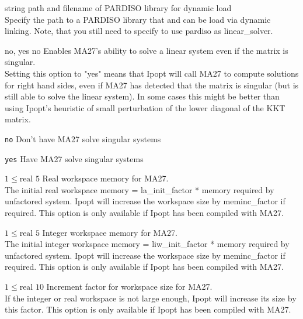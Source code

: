 %
{string}%
{}%
{path and filename of PARDISO library for dynamic load\\
Specify the path to a PARDISO library that and can be load via dynamic linking. Note, that you still need to specify to use pardiso as linear\_solver.}%
{}

%
{\ttfamily no, yes}%
{no}%
{Enables MA27's ability to solve a linear system even if the matrix is singular.\\
Setting this option to "yes" means that Ipopt will call MA27 to compute solutions for right hand sides, even if MA27 has detected that the matrix is singular (but is still able to solve the linear system). In some cases this might be better than using Ipopt's heuristic of small perturbation of the lower diagonal of the KKT matrix.}%
{\begin{list}{}{
\setlength{\parsep}{0em}
\setlength{\leftmargin}{5ex}
\setlength{\labelwidth}{2ex}
\setlength{\itemindent}{0ex}
\setlength{\topsep}{0pt}}
\item[\texttt{no}] Don't have MA27 solve singular systems
\item[\texttt{yes}] Have MA27 solve singular systems
\end{list}
}

%
{$1\leq\textrm{real}$}%
{$5$}%
{Real workspace memory for MA27.\\
The initial real workspace memory = la\_init\_factor * memory required by unfactored system. Ipopt will increase the workspace size by meminc\_factor if required.  This option is only available if  Ipopt has been compiled with MA27.}%
{}

%
{$1\leq\textrm{real}$}%
{$5$}%
{Integer workspace memory for MA27.\\
The initial integer workspace memory = liw\_init\_factor * memory required by unfactored system. Ipopt will increase the workspace size by meminc\_factor if required.  This option is only available if Ipopt has been compiled with MA27.}%
{}

%
{$1\leq\textrm{real}$}%
{$10$}%
{Increment factor for workspace size for MA27.\\
If the integer or real workspace is not large enough, Ipopt will increase its size by this factor.  This option is only available if Ipopt has been compiled with MA27.}%
{}

